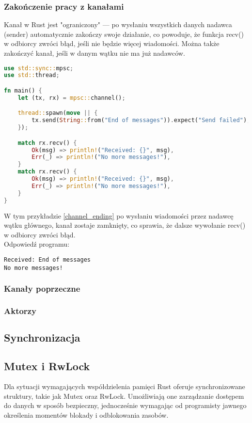 \subsubsection{Zakończenie pracy z kanałami}
Kanał w Rust jest "ograniczony" — po wysłaniu wszystkich danych nadawca (sender) automatycznie zakończy swoje działanie, co powoduje, że funkcja recv() w odbiorcy zwróci błąd, jeśli nie będzie więcej wiadomości. Można także zakończyć kanał, jeśli w danym wątku nie ma już nadawców.
\begin{lstlisting}[language=Rust, caption=Zakończenie kanału, label=channel_ending]
use std::sync::mpsc;
use std::thread;

fn main() {
    let (tx, rx) = mpsc::channel();

    thread::spawn(move || {
        tx.send(String::from("End of messages")).expect("Send failed");
    });

    match rx.recv() {
        Ok(msg) => println!("Received: {}", msg),
        Err(_) => println!("No more messages!"),
    }
    match rx.recv() {
        Ok(msg) => println!("Received: {}", msg),
        Err(_) => println!("No more messages!"),
    }
}

\end{lstlisting}
W tym przykładzie \ref{channel_ending} po wysłaniu wiadomości przez nadawcę wątku głównego, kanał zostaje zamknięty, co sprawia, że dalsze wywołanie recv() w odbiorcy zwróci błąd.\\
Odpowiedź programu:
\begin{verbatim}
Received: End of messages
No more messages!
\end{verbatim}

\subsubsection{Kanały poprzeczne }
\subsubsection{Aktorzy}

\subsection{Synchronizacja}
\subsection{Mutex i RwLock}

Dla sytuacji wymagających współdzielenia pamięci Rust oferuje synchronizowane struktury, takie jak Mutex  oraz RwLock. Umożliwiają one zarządzanie dostępem do danych w sposób bezpieczny, jednocześnie wymagając od programisty jawnego określenia momentów blokady i odblokowania zasobów.

